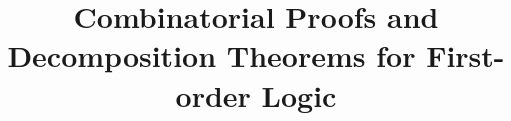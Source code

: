\documentclass[conference,twosided,10pt]{IEEEtran}
\theoremstyle{definition}
\begin{document}
\vlnosmallleftlabels

%
\title{Combinatorial Proofs and Decomposition Theorems for First-order Logic}





% 
\end{document}
